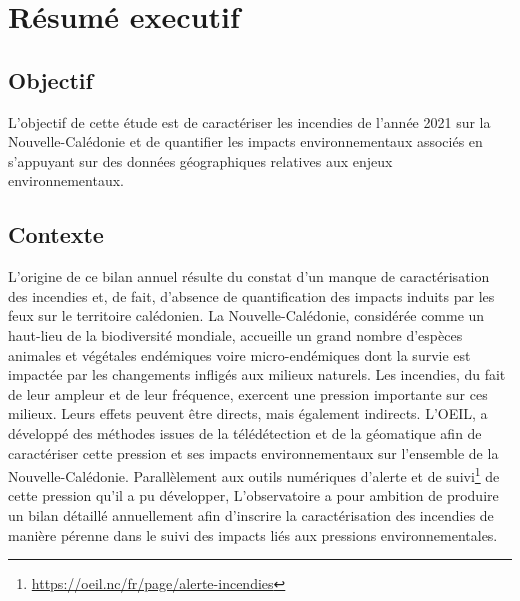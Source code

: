 \documentclass[
  11pt,
  letterpaper,
]{scrreprt}
\begin{document}

\chapter*{Résumé executif}\label{ruxe9sumuxe9-executif}


\section*{Objectif}\label{objectif}


L'objectif de cette étude est de caractériser les incendies de l'année
2021 sur la Nouvelle-Calédonie et de quantifier les impacts
environnementaux associés en s'appuyant sur des données géographiques
relatives aux enjeux environnementaux.

\section*{Contexte}\label{contexte}


L'origine de ce bilan annuel résulte du constat d'un manque de
caractérisation des incendies et, de fait, d'absence de quantification
des impacts induits par les feux sur le territoire calédonien. La
Nouvelle-Calédonie, considérée comme un haut-lieu de la biodiversité
mondiale, accueille un grand nombre d'espèces animales et végétales
endémiques voire micro-endémiques dont la survie est impactée par les
changements infligés aux milieux naturels. Les incendies, du fait de
leur ampleur et de leur fréquence, exercent une pression importante sur
ces milieux. Leurs effets peuvent être directs, mais également
indirects. L'OEIL, a développé des méthodes issues de la télédétection
et de la géomatique afin de caractériser cette pression et ses impacts
environnementaux sur l'ensemble de la Nouvelle-Calédonie. Parallèlement
aux outils numériques d'alerte et de suivi\footnote{\url{https://oeil.nc/fr/page/alerte-incendies}}
de cette pression qu'il a pu développer, L'observatoire a pour ambition
de produire un bilan détaillé annuellement afin d'inscrire la
caractérisation des incendies de manière pérenne dans le suivi des
impacts liés aux pressions environnementales.
\end{document}
